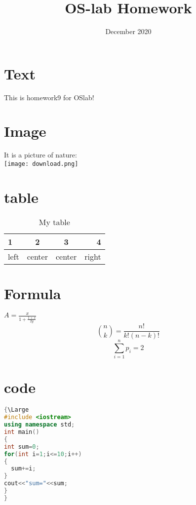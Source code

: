 \documentclass{article}
\date{December 2020}
\begin{document}
\title{OS-lab Homework}
\section{Text}
\begin{center}
  \Large  This is homework9 for OSlab!\\
\end{center}
\section{Image}
\begin{center}
  \Large It is a picture of nature:\\
   \texttt{[image: download.png]}
\end{center}
\section{table}
\begin{table}[h]
\begin{center}
{\Large
    \caption{My table}
    \begin{tabular}{|l|c|c|r|}
    \hline
    1&2&3&4\\
    \hline
    left&center&center&right\\  
    \hline
    \end{tabular}
}
    \end{center}
\end{table}
\section{Formula}
\begin{center}
{\Large
  $A=\frac{x}{1+\frac{1+x}{2y}}$
  $$\binom{n}{k}=\frac{n!}{k!(n-k)!}$$
  $$\sum_{i=1}^{n} p_{i}=2$$
}
\end{center}
\section{code}
\begin{lstlisting}[language=C++]
{\Large
#include <iostream>
using namespace std;
int main()
{
int sum=0;
for(int i=1;i<=10;i++)
{
  sum+=i;
}
cout<<"sum="<<sum;
}
}
\end{lstlisting}
\end{document}
